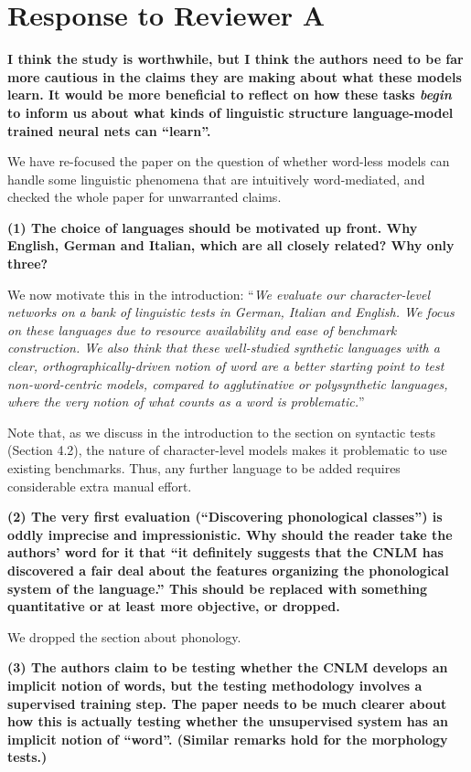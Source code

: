 \documentclass{article}
\begin{document}
\section{Response to Reviewer A}

\textbf{I think the study is worthwhile, but I think the authors need to be far more cautious in the claims they are making about what these models learn. It would be more beneficial to reflect on how these tasks \emph{begin} to inform us about what kinds of linguistic structure language-model trained neural nets can ``learn''.}

We have re-focused the paper on the question of whether word-less models can handle some linguistic phenomena that are intuitively word-mediated, and checked the whole paper for unwarranted claims.
\newline

\textbf{(1) The choice of languages should be motivated up front. Why English, German and Italian, which are all closely related? Why only three?}

We now motivate this in the introduction: ``\textit{We evaluate our character-level networks on a bank of linguistic tests in German, Italian and English. We focus on these languages due to resource availability and ease of benchmark construction. We also think that these well-studied synthetic languages with a clear, orthographically-driven notion of word are a better starting point to test non-word-centric models, compared to agglutinative or polysynthetic languages, where the very notion of what counts as a word is problematic.}''

Note that, as we discuss in the introduction to the section on syntactic tests (Section 4.2), the nature of character-level models makes it problematic to use existing benchmarks. Thus, any further language to be added requires considerable extra manual effort.
\newline

\textbf{(2) The very first evaluation (``Discovering phonological classes'') is oddly imprecise and impressionistic. Why should the reader take the authors' word for it that ``it definitely suggests that the CNLM has discovered a fair deal about the features organizing the phonological system of the language.'' This should be replaced with something quantitative or at least more objective, or dropped.}

We dropped the section about phonology.
\newline

\textbf{(3) The authors claim to be testing whether the CNLM develops an implicit notion of words, but the testing methodology involves a supervised training step. The paper needs to be much clearer about how this is actually testing whether the unsupervised system has an implicit notion of ``word''. (Similar remarks hold for the morphology tests.)}
\end{document}
